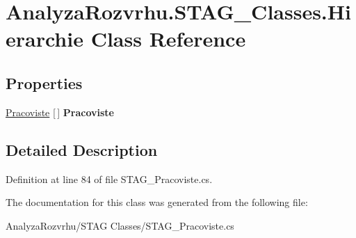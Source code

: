 \hypertarget{class_analyza_rozvrhu_1_1_s_t_a_g___classes_1_1_hierarchie}{}\section{Analyza\+Rozvrhu.\+S\+T\+A\+G\+\_\+\+Classes.\+Hierarchie Class Reference}
\label{class_analyza_rozvrhu_1_1_s_t_a_g___classes_1_1_hierarchie}
\subsection*{Properties}
\begin{DoxyCompactItemize}
\item 
\mbox{\label{class_analyza_rozvrhu_1_1_s_t_a_g___classes_1_1_hierarchie_adc6fc79087c4930a6c84d0e667e8d659}} 
\hyperlink{class_analyza_rozvrhu_1_1_s_t_a_g___classes_1_1_pracoviste}{Pracoviste} \mbox{[}$\,$\mbox{]} {\bfseries Pracoviste}
\end{DoxyCompactItemize}


\subsection{Detailed Description}


Definition at line 84 of file S\+T\+A\+G\+\_\+\+Pracoviste.\+cs.



The documentation for this class was generated from the following file\+:\begin{DoxyCompactItemize}
\item 
Analyza\+Rozvrhu/\+S\+T\+A\+G Classes/S\+T\+A\+G\+\_\+\+Pracoviste.\+cs\end{DoxyCompactItemize}
